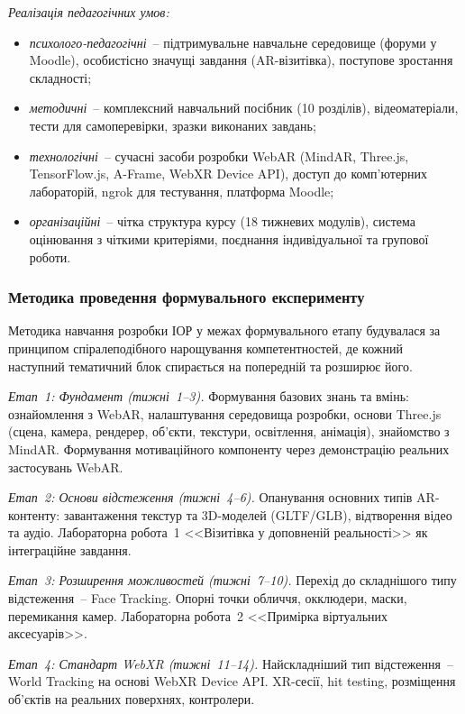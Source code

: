 \textit{Реалізація педагогічних умов:}
\begin{itemize}
\item \textit{психолого-педагогічні}~-- підтримувальне навчальне середовище (форуми у Moodle), особистісно значущі завдання (AR-візитівка), поступове зростання складності;
\item \textit{методичні}~-- комплексний навчальний посібник (10 розділів), відеоматеріали, тести для самоперевірки, зразки виконаних завдань;
\item \textit{технологічні}~-- сучасні засоби розробки WebAR (MindAR, Three.js, TensorFlow.js, A-Frame, WebXR Device API), доступ до комп'ютерних лабораторій, ngrok для тестування, платформа Moodle;
\item \textit{організаційні}~-- чітка структура курсу (18 тижневих модулів), система оцінювання з чіткими критеріями, поєднання індивідуальної та групової роботи.
\end{itemize}

\subsubsection{Методика проведення формувального експерименту}

Методика навчання розробки ІОР у межах формувального етапу будувалася за принципом спіралеподібного нарощування компетентностей, де кожний наступний тематичний блок спирається на попередній та розширює його.

\textit{Етап~1: Фундамент (тижні~1--3).} Формування базових знань та вмінь: ознайомлення з WebAR, налаштування середовища розробки, основи Three.js (сцена, камера, рендерер, об'єкти, текстури, освітлення, анімація), знайомство з MindAR. Формування мотиваційного компоненту через демонстрацію реальних застосувань WebAR.

\textit{Етап~2: Основи відстеження (тижні~4--6).} Опанування основних типів AR-контенту: завантаження текстур та 3D-моделей (GLTF/GLB), відтворення відео та аудіо. Лабораторна робота~1 <<Візитівка у доповненій реальності>> як інтеграційне завдання.

\textit{Етап~3: Розширення можливостей (тижні~7--10).} Перехід до складнішого типу відстеження~-- Face Tracking. Опорні точки обличчя, окклюдери, маски, перемикання камер. Лабораторна робота~2 <<Примірка віртуальних аксесуарів>>.

\textit{Етап~4: Стандарт WebXR (тижні~11--14).} Найскладніший тип відстеження~-- World Tracking на основі WebXR Device API. XR-сесії, hit testing, розміщення об'єктів на реальних поверхнях, контролери.

